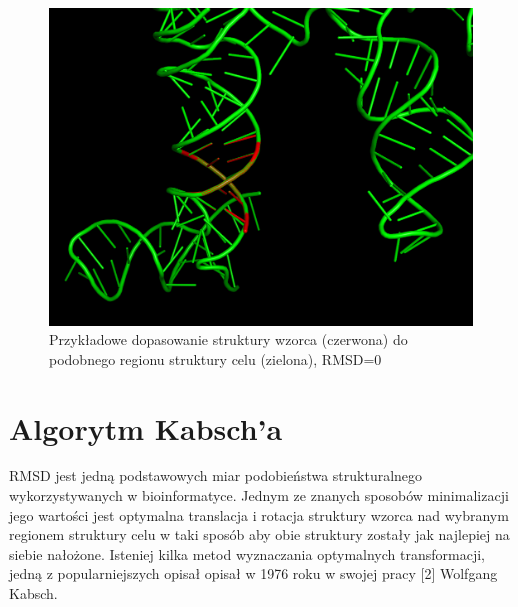 \documentclass[licencjacka]{pracamgr}
\begin{document}
\begin{figure}[H]
\centering
\includegraphics[scale=0.2]{rmsd0}
\caption{Przykładowe dopasowanie struktury wzorca (czerwona) do podobnego regionu struktury celu (zielona), RMSD=0}
\end{figure}

\section{Algorytm Kabsch'a}
RMSD jest jedną podstawowych miar podobieństwa strukturalnego wykorzystywanych w bioinformatyce. Jednym ze znanych sposobów minimalizacji jego wartości jest optymalna translacja i rotacja struktury wzorca nad wybranym regionem struktury celu w taki sposób aby obie struktury zostały jak najlepiej na siebie nałożone. Isteniej kilka metod wyznaczania optymalnych transformacji, jedną z popularniejszych opisał opisał w 1976 roku w swojej pracy [2] Wolfgang Kabsch.
\end{document}
